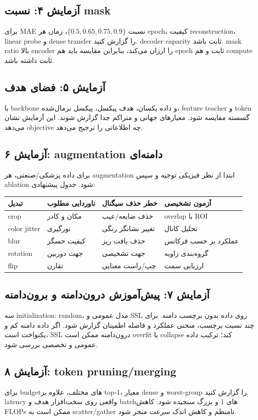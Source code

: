 \documentclass[12pt,openany,oneside]{book}
\begin{document}
\subsection{آزمایش ۴: نسبت mask}
برای MAE نسبت $\{0.5,0.65,0.75,0.9\}$، زمان هر epoch، کیفیت reconstruction، linear probe و dense transfer را گزارش کنید. decoder capacity ثابت باشد. mask ratio بالا encoder را ارزان می‌کند، بنابراین مقایسه باید هم epoch ثابت و هم compute ثابت داشته باشد.

\subsection{آزمایش ۵: فضای هدف}
با backbone و داده یکسان، هدف پیکسل، پیکسل نرمال‌شده، feature teacher و token گسسته مقایسه شود. معیارهای جهانی و متراکم جدا گزارش شوند. این آزمایش نشان می‌دهد objective چه اطلاعاتی را ترجیح می‌دهد.

\subsection{آزمایش ۶: augmentation دامنه‌ای}
برای داده پزشکی/صنعتی، هر augmentation ابتدا از نظر فیزیکی توجیه و سپس ablation شود. جدول پیشنهادی:
\begin{longtable}{p{32mm}p{35mm}p{35mm}p{32mm}}
\toprule
تبدیل & ناوردایی مطلوب & خطر حذف سیگنال & آزمون تشخیصی \\
\midrule
crop & مکان و کادر & حذف ضایعه/عیب & overlap با ROI \\
color jitter & نورگیری & تغییر نشانگر رنگی & تحلیل کانال \\
blur & کیفیت حسگر & حذف بافت ریز & عملکرد بر حسب فرکانس \\
rotation & جهت دوربین & جهت تشخیصی & گروه‌بندی زاویه \\
flip & تقارن & چپ/راست معنایی & ارزیابی سمت \\
\bottomrule
\end{longtable}

\subsection{آزمایش ۷: پیش‌آموزش درون‌دامنه و برون‌دامنه}
سه initialization: random، مدل عمومی و SSL روی داده بدون برچسب دامنه. برای چند نسبت برچسب، منحنی عملکرد و فاصله اطمینان گزارش شود. اگر داده دامنه کم و یکنواخت است، SSL درون‌دامنه ممکن است overfit یا collapse کند؛ ترکیب داده عمومی و تخصصی بررسی شود.

\subsection{آزمایش ۸: token pruning/merging}
برای budgetهای مختلف، علاوه بر top-1، معیار dense و worst-group را گزارش کنید. latency واقعی روی سخت‌افزار هدف و batchهای 1 و بزرگ سنجیده شود. کاهش FLOPs ممکن است به scatter/gather نامنظم و کاهش اندک سرعت منجر شود.
\end{document}

